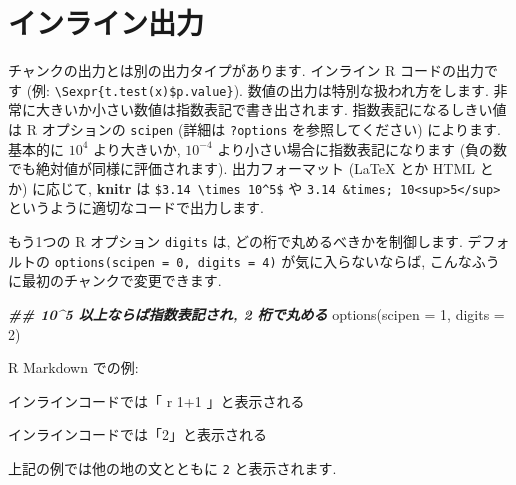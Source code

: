 \documentclass[
  lualatex,ja=standard,jafont=noto-otf]{bxjsreport}
\newenvironment{Shaded}{\begin{snugshade}}{\end{snugshade}}
\newcommand{\AttributeTok}[1]{\textcolor[rgb]{0.77,0.63,0.00}{#1}}
\newcommand{\DecValTok}[1]{\textcolor[rgb]{0.00,0.00,0.81}{#1}}
\newcommand{\DocumentationTok}[1]{\textcolor[rgb]{0.56,0.35,0.01}{\textbf{\textit{#1}}}}
\newcommand{\FunctionTok}[1]{\textcolor[rgb]{0.00,0.00,0.00}{#1}}
\newcommand{\InformationTok}[1]{\textcolor[rgb]{0.56,0.35,0.01}{\textbf{\textit{#1}}}}
\newcommand{\NormalTok}[1]{#1}
\begin{document}
\hypertarget{ux30a4ux30f3ux30e9ux30a4ux30f3ux51faux529b}{%
\section*{インライン出力}\label{ux30a4ux30f3ux30e9ux30a4ux30f3ux51faux529b}}

チャンクの出力とは別の出力タイプがあります. インライン R
コードの出力です (例:
\texttt{\textbackslash{}Sexpr\{t.test(x)\$p.value\}}).
数値の出力は特別な扱われ方をします.
非常に大きいか小さい数値は指数表記で書き出されます.
指数表記になるしきい値は R オプションの \texttt{scipen} (詳細は
\texttt{?options} を参照してください) によります. 基本的に \(10^4\)
より大きいか, \(10^{-4}\) より小さい場合に指数表記になります
(負の数でも絶対値が同様に評価されます). 出力フォーマット (LaTeX とか
HTML とか) に応じて, \textbf{knitr} は
\texttt{\$3.14\ \textbackslash{}times\ 10\^{}5\$} や
\texttt{3.14\ \&times;\ 10\textless{}sup\textgreater{}5\textless{}/sup\textgreater{}}
というように適切なコードで出力します.

もう1つの R オプション \texttt{digits} は,
どの桁で丸めるべきかを制御します. デフォルトの
\texttt{options(scipen\ =\ 0,\ digits\ =\ 4)} が気に入らないならば,
こんなふうに最初のチャンクで変更できます.

\begin{Shaded}
\begin{Highlighting}[numbers=left,,]
\DocumentationTok{\#\# 10\^{}5 以上ならば指数表記され, 2 桁で丸める}
\FunctionTok{options}\NormalTok{(}\AttributeTok{scipen =} \DecValTok{1}\NormalTok{, }\AttributeTok{digits =} \DecValTok{2}\NormalTok{)}
\end{Highlighting}
\end{Shaded}

R Markdown での例:

\begin{Shaded}
\begin{Highlighting}[]
\NormalTok{インラインコードでは「\textasciigrave{}\textasciigrave{}}\InformationTok{\textasciigrave{} \textasciigrave{}}\NormalTok{r\textquotesingle{}\textquotesingle{} 1+1\textasciigrave{} \textasciigrave{}\textasciigrave{}\textasciigrave{}」と表示される}
\end{Highlighting}
\end{Shaded}

インラインコードでは「2」と表示される

上記の例では他の地の文とともに \texttt{2} と表示されます.
\end{document}
